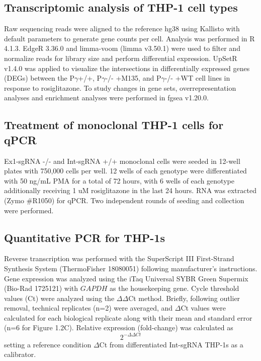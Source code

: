 \subsection{Transcriptomic analysis of THP-1 cell types}
 Raw sequencing reads were aligned to the reference hg38 using Kallisto with default parameters\cite{Bray2016-zt} to generate gene counts per cell. Analysis was performed in R 4.1.3. EdgeR 3.36.0 and limma-voom (limma v3.50.1) were used to filter and normalize reads for library size and perform differential expression\cite{Robinson2010-qx,Law2014-yh}. UpSetR v1.4.0 was applied to visualize the intersections in differentially expressed genes (DEGs) between the P$\gamma$+/+, P$\gamma$-/- +M135, and P$\gamma$-/- +WT cell lines in response to rosiglitazone\cite{Lex2014-lr,Conway2017-hp}. To study changes in gene sets, overrepresentation analyses and enrichment analyses were performed in fgsea v1.20.0\cite{Korotkevich2021-ra}.

\subsection{Treatment of monoclonal THP-1 cells for qPCR}
Ex1-sgRNA -/- and Int-sgRNA +/+ monoclonal cells were seeded in 12-well plates with 750,000 cells per well. 12 wells of each genotype were differentiated with 50 ng/mL PMA for a total of 72 hours, with 6 wells of each genotype additionally receiving 1 uM rosiglitazone in the last 24 hours. RNA was extracted (Zymo \#R1050) for qPCR. Two independent rounds of seeding and collection were performed.

\subsection{Quantitative PCR for THP-1s}
Reverse transcription was performed with the SuperScript III First-Strand Synthesis System (ThermoFisher 18080051) following manufacturer’s instructions. Gene expression was analyzed using the iTaq Universal SYBR Green Supermix (Bio-Rad 1725121) with \(GAPDH\) as the housekeeping gene. Cycle threshold values (Ct) were analyzed using the $\Delta\Delta$Ct method\cite{Livak2001-va}. Briefly, following outlier removal, technical replicates (n=2) were averaged, and $\Delta$Ct values were calculated for each biological replicate along with their mean and standard error (n=6 for Figure 1.2C). Relative expression (fold-change) was calculated as \[2^{-\Delta\Delta Ct}\] setting a reference condition $\Delta$Ct from differentiated Int-sgRNA THP-1s as a calibrator.

